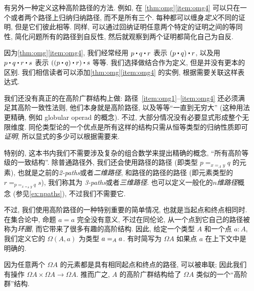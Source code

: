 \begin{rmk}
    有另外一种定义这种高阶路径的方法.
    例如, 在 \cref{thm:omg}\ref{item:omg4} 可以只在一个或者两个路径上归纳归纳路径, 而不是所有三个.
    每种都可以缠身\emph{定义}不同的证明, 但是它们彼此相等.
    同样, 可以通过回纳证明任意两个特定的证明之间的等同性, 简化问题所有的路径到自反性, 然后就观察到两个证明都简化自己为自反.
\end{rmk}

因为\cref{thm:omg}\ref{item:omg4}, 我们经常经用 $p\ct q\ct r$ 表示 $(p\ct q)\ct r$, 以及用 $p\ct q\ct r \ct s$ 表示 $((p\ct q)\ct r)\ct s$ 等等.
我们选择做结合作为定义, 但是并没有更本的区别.
我们相信读者可以添加\cref{thm:omg}\ref{item:omg4} 的实例, 根据需要关联这样表达式.

我们还没有真正的在高阶广群结构上做: 路径~\ref{item:omg1}--\ref{item:omg4} 还必须满足其高阶一致性法则, 他们本身就是高阶路径, %
%
%
%
以及等等``一直到无穷大'' (这种用法更精确, 例如 globular operad 的概念).
不过, 大部分情况没有必要显式形成整个无限维度.
同伦类型论的一个优点是所有这样的结构只需从恒等类型的归纳性质即可\emph{证明}, 所以显式的多少可以根据需要来.

特别的, 这本书内我们不需要涉及复杂的组合数学来提出精确的概念, ``所有高阶等级的一致结构''.
除普通路径外, 我们还会使用路径的路径 (即类型 $p =_{x=_A y} q$ 的元素), 也就是之前的\emph{2-paths}或者\emph{二维路径}, 和路径的路径的路径 (即元素类型的 $r = _{p =_{x=_A y} q} s$), 我们称其为 \emph{3-paths}或者\emph{三维路径}.
也可以定义一般化的\emph{$n$维路径}概念%
%
%
%
(参见\cref{ex:npaths}), 不过我们不需要它.

不过, 我们使用高阶路径的一种特别重要的简单情况, 也就是当起点和终点相同时.
在集合论中, 命题 $a=a$ 完全没有意义, 不过在同伦论, 从一个点到它自己的路径被称为\emph{环圈}, 而它带来了很多有趣的高阶结构.
因此, 给定一个类型 $A$ 和一个点 $a:A$, 我们定义它的 %
$\Omega(A,a)$ 为类型 $\id[A]{a}{a}$. 有时简写为 $\Omega A$ 如果点 $a$ 在上下文中是明确的.

因为任意两个 $\Omega A$ 的元素都是具有相同起点和终点的路径, 可以被串联;
因此我们有操作 $\Omega A\times \Omega A\to \Omega A$. 推而广之, $A$ 的高阶广群结构给了 $\Omega A$ 类似的一个``高阶群''结构.

